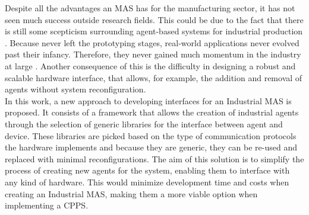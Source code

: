 Despite all the advantages an \acrshort{MAS} has for the manufacturing sector, it has not seen much success outside research fields. This could be due to the fact that there is still some scepticism surrounding agent-based systems for industrial production \cite{bottling_plant_part2}. Because  never left the prototyping stages, real-world applications never evolved past their infancy. Therefore, they never gained much momentum in the industry at large \cite{karnouskos02}. Another consequence of this is the difficulty in designing a robust and scalable hardware interface, that allows, for example, the addition and removal of agents without system reconfiguration.\\

In this work, a new approach to developing interfaces for an Industrial \acrshort{MAS} is proposed. It consists of a framework that allows the creation of industrial agents through the selection of generic libraries for the interface between agent and device. These libraries are picked based on the type of communication protocols the hardware implements and because they are generic, they can be re-used and replaced with minimal reconfigurations. The aim of this solution is to simplify the process of creating new agents for the system, enabling them to interface with any kind of hardware. This would minimize development time and costs when creating an Industrial \acrshort{MAS}, making them a more viable option when implementing a \acrshort{CPPS}. 